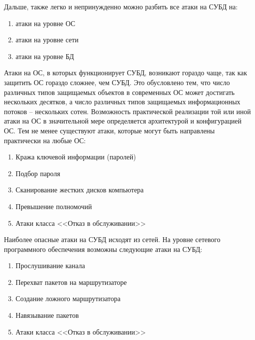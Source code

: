 Дальше, также легко и непринужденно можно разбить все атаки на СУБД на:
\begin{enumerate}
	\item атаки на уровне ОС
	\item атаки на уровне сети
	\item атаки на уровне БД
\end{enumerate}
Атаки на ОС, в которых функционирует СУБД, возникают гораздо чаще, так как защитить ОС гораздо сложнее, чем СУБД. Это обусловлено тем, что число различных типов защищаемых объектов в современных ОС может достигать нескольких десятков, а число различных типов защищаемых информационных потоков -- нескольких сотен. Возможность практической реализации той или иной атаки на ОС в значительной мере определяется архитектурой и конфигурацией ОС. Тем не менее существуют атаки, которые могут быть направлены практически на любые ОС:
\begin{enumerate}
	\item Кража ключевой информации (паролей)
	\item Подбор пароля
	\item Сканирование жестких дисков компьютера
	\item Превышение полномочий
	\item Атаки класса <<Отказ в обслуживании>>
\end{enumerate}
Наиболее опасные атаки на СУБД исходят из сетей. На уровне сетевого
программного обеспечения возможны следующие атаки на СУБД:
\begin{enumerate}
	\item Прослушивание канала
	\item Перехват пакетов на маршрутизаторе
	\item Создание ложного маршрутизатора
	\item Навязывание пакетов
	\item Атаки класса <<Отказ в обслуживании>>	
\end{enumerate}

